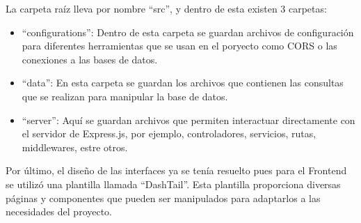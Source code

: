 La carpeta raíz lleva por nombre ``src'', y dentro de esta existen 3 carpetas:
    \begin{itemize}
        \item ``configurations'': Dentro de esta carpeta se guardan archivos de configuración para diferentes herramientas que se usan en el poryecto como CORS o las conexiones a las bases de datos.
        \item ``data'': En esta carpeta se guardan los archivos que contienen las consultas que se realizan para manipular la base de datos.
        \item ``server'': Aquí se guardan archivos que permiten interactuar directamente con el servidor de Express.js, por ejemplo, controladores, servicios, rutas, middlewares, estre otros.
    \end{itemize}

Por último, el diseño de las interfaces ya se tenía resuelto pues para el Frontend se utilizó una plantilla llamada ``DashTail''. Esta plantilla proporciona diversas páginas y componentes que pueden ser manipulados para adaptarlos a las necesidades del proyecto.